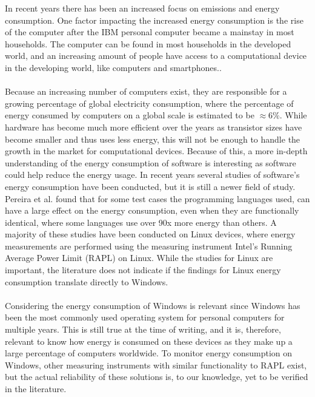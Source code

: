 
In recent years there has been an increased focus on emissions and energy consumption. One factor impacting the increased energy consumption is the rise of the computer after the IBM personal computer became a mainstay in most households. The computer can be found in most households in the developed world, and an increasing amount of people have access to a computational device in the developing world, like computers and smartphones.\cite{DevelopedWorldPC}. 

\paragraph*{}
Because an increasing number of computers exist, they are responsible for a growing percentage of global electricity consumption, where the percentage of energy consumed by computers on a global scale is estimated to be $\approx 6\%$\cite{somavat2011energy}. While hardware has become much more efficient over the years as transistor sizes have become smaller and thus uses less energy, this will not be enough to handle the growth in the market for computational devices\cite{procaccianti2011profiling}. Because of this, a more in-depth understanding of the energy consumption of software is interesting as software could help reduce the energy usage\cite{somavat2011energy}. In recent years several studies of software's energy consumption have been conducted, but it is still a newer field of study. Pereira et al.\cite{Pereira2017} found that for some test cases the programming languages used, can have a large effect on the energy consumption, even when they are functionally identical, where some languages use over 90x more energy than others. A majority of these studies have been conducted on Linux devices, where energy measurements are performed using the measuring instrument Intel's Running Average Power Limit (RAPL) on Linux. While the studies for Linux are important, the literature does not indicate if the findings for Linux energy consumption translate directly to Windows\cite{Pereira2017}. 

\paragraph*{}
Considering the energy consumption of Windows is relevant since Windows has been the most commonly used operating system for personal computers for multiple years. This is still true at the time of writing, and it is, therefore, relevant to know how energy is consumed on these devices as they make up a large percentage of computers worldwide\cite{OSShare}. To monitor energy consumption on Windows, other measuring instruments with similar functionality to RAPL exist, but the actual reliability of these solutions is, to our knowledge, yet to be verified in the literature.

